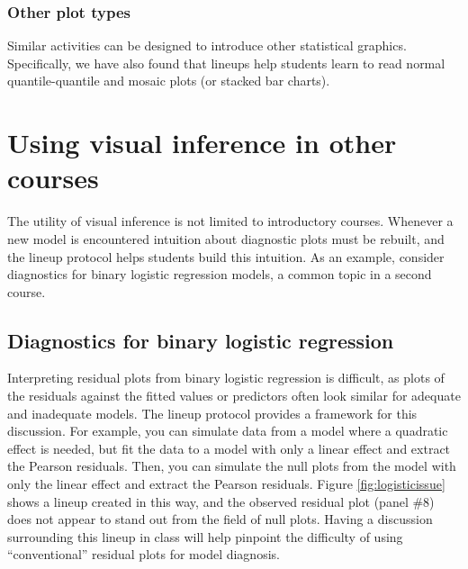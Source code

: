 \documentclass[12pt]{article}
\begin{document}
\hypertarget{other-plot-types}{%
\subsubsection{Other plot types}\label{other-plot-types}}

Similar activities can be designed to introduce other statistical
graphics. Specifically, we have also found that lineups help students
learn to read normal quantile-quantile and mosaic plots (or stacked bar
charts).

\hypertarget{using-visual-inference-in-other-courses}{%
\section{Using visual inference in other
courses}\label{using-visual-inference-in-other-courses}}

\label{sec:othercourses}

The utility of visual inference is not limited to introductory courses.
Whenever a new model is encountered intuition about diagnostic plots
must be rebuilt, and the lineup protocol helps students build this
intuition. As an example, consider diagnostics for binary logistic
regression models, a common topic in a second course.

\hypertarget{diagnostics-for-binary-logistic-regression}{%
\subsection{Diagnostics for binary logistic
regression}\label{diagnostics-for-binary-logistic-regression}}

Interpreting residual plots from binary logistic regression is
difficult, as plots of the residuals against the fitted values or
predictors often look similar for adequate and inadequate models. The
lineup protocol provides a framework for this discussion. For example,
you can simulate data from a model where a quadratic effect is needed,
but fit the data to a model with only a linear effect and extract the
Pearson residuals. Then, you can simulate the null plots from the model
with only the linear effect and extract the Pearson residuals. Figure
\ref{fig:logisticissue} shows a lineup created in this way, and the
observed residual plot (panel \#8) does not appear to stand out from the
field of null plots. Having a discussion surrounding this lineup in
class will help pinpoint the difficulty of using ``conventional''
residual plots for model diagnosis.
\end{document}
